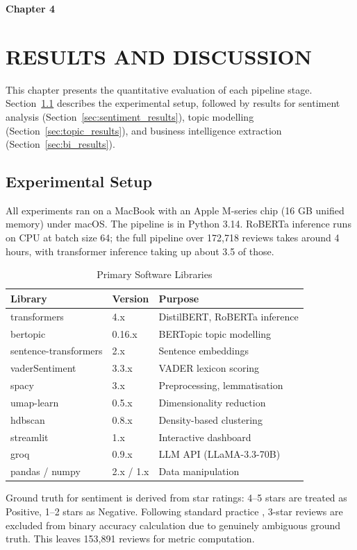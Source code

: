 \newpage
\textbf{\huge Chapter 4}
\section{RESULTS AND DISCUSSION}
\begin{justify}
This chapter presents the quantitative evaluation of each pipeline stage. Section~\ref{sec:setup} describes the experimental setup, followed by results for sentiment analysis (Section~\ref{sec:sentiment_results}), topic modelling (Section~\ref{sec:topic_results}), and business intelligence extraction (Section~\ref{sec:bi_results}).
\end{justify}

\subsection{Experimental Setup}
\label{sec:setup}
\begin{justify}
All experiments ran on a MacBook with an Apple M-series chip (16 GB unified memory) under macOS. The pipeline is in Python 3.14. RoBERTa inference runs on CPU at batch size 64; the full pipeline over 172,718 reviews takes around 4 hours, with transformer inference taking up about 3.5 of those.

\begin{table}[H]
\centering
\caption{Primary Software Libraries}
\renewcommand{\arraystretch}{1.3}
\begin{tabular}{|l|l|l|}
\hline
\textbf{Library} & \textbf{Version} & \textbf{Purpose} \\
\hline
transformers & 4.x & DistilBERT, RoBERTa inference \\
\hline
bertopic & 0.16.x & BERTopic topic modelling \\
\hline
sentence-transformers & 2.x & Sentence embeddings \\
\hline
vaderSentiment & 3.3.x & VADER lexicon scoring \\
\hline
spacy & 3.x & Preprocessing, lemmatisation \\
\hline
umap-learn & 0.5.x & Dimensionality reduction \\
\hline
hdbscan & 0.8.x & Density-based clustering \\
\hline
streamlit & 1.x & Interactive dashboard \\
\hline
groq & 0.9.x & LLM API (LLaMA-3.3-70B) \\
\hline
pandas / numpy & 2.x / 1.x & Data manipulation \\
\hline
\end{tabular}
\label{tab:libraries}
\end{table}

Ground truth for sentiment is derived from star ratings: 4--5 stars are treated as Positive, 1--2 stars as Negative. Following standard practice \cite{yin2020benchmarking}, 3-star reviews are excluded from binary accuracy calculation due to genuinely ambiguous ground truth. This leaves 153,891 reviews for metric computation.
\end{justify}

